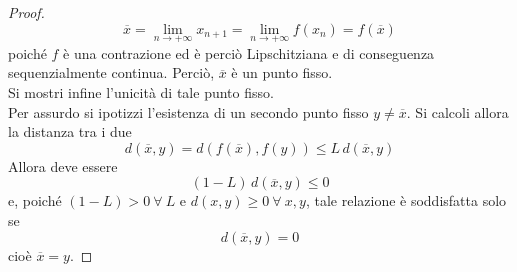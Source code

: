 \begin{proof}
\begin{equation*}
        \overline{x}= \lim_{n \to +\infty}{x_{n+1}}=\lim_{n \to +\infty}{f(x_n)} = f(\overline{x})
    \end{equation*}
    poiché $f$ è una contrazione ed è perciò Lipschitziana e di conseguenza sequenzialmente continua. Perciò, $\overline{x}$ è un punto fisso.\\
    Si mostri infine l'unicità di tale punto fisso.\\
    Per assurdo si ipotizzi l'esistenza di un secondo punto fisso $y \neq \overline{x}$. Si calcoli allora la distanza tra i due
    \begin{equation*}
        d(\overline{x}, y)= d(f(\overline{x}), f(y)) \leq L\, d(\overline{x}, y)
    \end{equation*}
    Allora deve essere 
    \begin{equation*}
        (1-L)\, d(\overline{x}, y) \leq 0
    \end{equation*}
    e, poiché $(1-L)>0\ \forall\ L$ e $d(x, y) \geq 0\ \forall\ x,y$, tale relazione è soddisfatta solo se
    \begin{equation*}
        d(\overline{x}, y)=0
    \end{equation*}
    cioè $\overline{x}=y$.
\end{proof}
